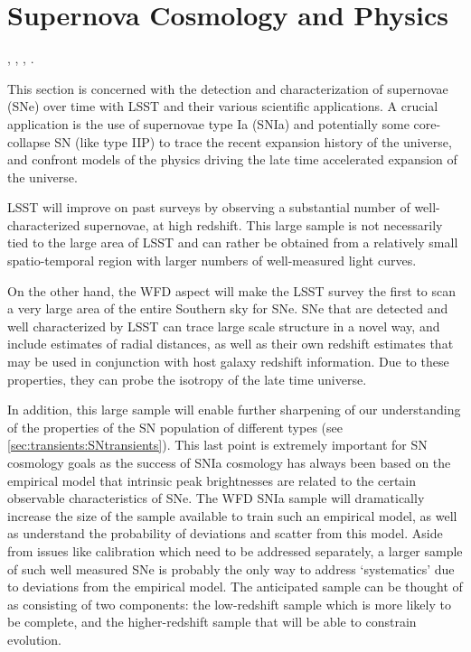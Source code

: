 
%
%
%
\clearpage
\section{Supernova Cosmology and Physics}
\def\secname{supernovae}\label{sec:\secname}

,
,
,
.

This section is concerned with the detection and characterization of
supernovae (SNe) over time with LSST and their various scientific
applications. A crucial application is the use of supernovae type
Ia (SNIa) and potentially some core-collapse SN (like type IIP) to trace
the recent expansion history of the universe, and confront models of the
physics driving the late time accelerated expansion of the universe.

LSST will improve on past surveys by observing a substantial number of well-characterized 
supernovae, at high redshift. This large sample is not necessarily tied to the large area of LSST 
and can rather be obtained from a relatively small spatio-temporal region with larger numbers of 
well-measured light curves.

On the other hand, the WFD aspect will make the LSST survey 
the first to scan a very large area of the entire Southern sky for
SNe. SNe that are detected and well characterized by LSST can trace
large scale structure in a novel way, and include estimates of radial distances, as 
well as
their own redshift estimates that may be used in conjunction with host
galaxy redshift information. Due to these properties, they can probe the
isotropy of the late time universe.    

In addition, this large sample will
enable further sharpening of our understanding of the properties of the
SN population of different types (see \autoref{sec:transients:SNtransients}). This last point is 
extremely 
important
for SN cosmology goals as the success of SNIa cosmology has always been
based on the empirical model that intrinsic peak brightnesses are
related to the certain observable characteristics of SNe.  The WFD SNIa
sample will dramatically increase the size of the sample available to
train such an empirical model, as well as understand the probability of
deviations and scatter from this model. Aside from issues like
calibration which need to be addressed separately, a larger sample of
such well measured SNe is probably the only way to address `systematics'
due to deviations from the empirical model. The anticipated sample can
be thought of as consisting of two components:  the low-redshift sample
which is more likely to be complete, and the higher-redshift sample that
will be able to constrain evolution.

